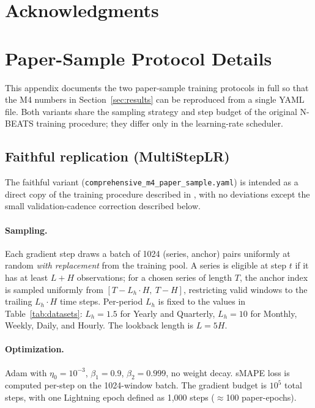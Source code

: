 \documentclass[11pt,a4paper]{article}
\begin{document}
\section*{Acknowledgments}


{
\small


}



\appendix

\section{Paper-Sample Protocol Details}
\label{app:protocols}

This appendix documents the two paper-sample training protocols in full so that the M4 numbers in Section~\ref{sec:results} can be reproduced from a single YAML file. Both variants share the sampling strategy and step budget of the original N-BEATS training procedure; they differ only in the learning-rate scheduler.

\subsection{Faithful replication (MultiStepLR)}

The faithful variant (\texttt{comprehensive\_m4\_paper\_sample.yaml}) is intended as a direct copy of the training procedure described in \citet[Section~5.2 and Appendix~D]{oreshkin2020nbeats}, with no deviations except the small validation-cadence correction described below.

\paragraph{Sampling.} Each gradient step draws a batch of 1024 (series, anchor) pairs uniformly at random \emph{with replacement} from the training pool. A series is eligible at step $t$ if it has at least $L + H$ observations; for a chosen series of length $T$, the anchor index is sampled uniformly from $[T - L_h \cdot H,\ T - H]$, restricting valid windows to the trailing $L_h \cdot H$ time steps. Per-period $L_h$ is fixed to the values in Table~\ref{tab:datasets}: $L_h = 1.5$ for Yearly and Quarterly, $L_h = 10$ for Monthly, Weekly, Daily, and Hourly. The lookback length is $L = 5H$.

\paragraph{Optimization.} Adam with $\eta_0 = 10^{-3}$, $\beta_1 = 0.9$, $\beta_2 = 0.999$, no weight decay. sMAPE loss is computed per-step on the 1024-window batch. The gradient budget is $10^5$ total steps, with one Lightning epoch defined as 1{,}000 steps ($\approx$100 paper-epochs).
\end{document}
